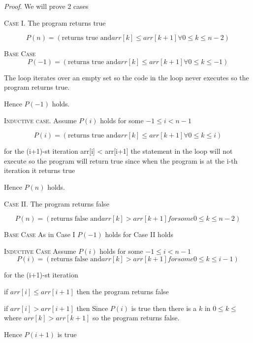  
\textit{Proof}.
We will prove 2 cases

\textsc{Case I.}
The program returns true

\[
P(n) = (\text{returns true and} arr[k] \leq arr[k+1] \forall 0 \leq k \leq n-2 )
\]

\textsc{Base Case}
\[
P(-1) = (\text{returns true and} arr[k] \leq arr[k+1] \forall 0 \leq k \leq -1)
\]

The loop iterates over an empty set so the code in the loop never executes so
the program returns true.

Hence $P(-1)$ holds.

\textsc{Inductive case.}
Assume $P(i)$ holds for some $-1 \leq i < n-1$

\[
P(i) = (\text{returns true and} arr[k] \leq arr[k+1] \forall 0 \leq k \leq i)
\]

for the (i+1)-st iteration arr[i] < arr[i+1] the statement in the loop will not execute
so the program will return true since when the program is at the i-th iteration it returns true

Hence $P(n)$ holds.

\textsc{Case II.}
The program returns false

\[
P(n) = (\text{returns false and} arr[k] > arr[k+1] for some 0 \leq k \leq n-2 )
\]

\textsc{Base Case}
As in Case I $P(-1)$ holds for Case II holds

\textsc{Inductive Case}
Assume $P(i)$ holds for some $-1 \leq i < n-1$
\[
P(i) = (\text{returns false and} arr[k] > arr[k+1] for some 0 \leq k \leq i-1 )
\]

for the (i+1)-st iteration

if $arr[i] \leq arr[i+1]$ then the program returns false

if $arr[i] > arr[i+1]$ then Since $P(i)$ is true then there is a $k$ in $0 \leq k \leq$
where $arr[k] > arr[k+1]$ so the program returns false.

Hence $P(i+1)$ is true
